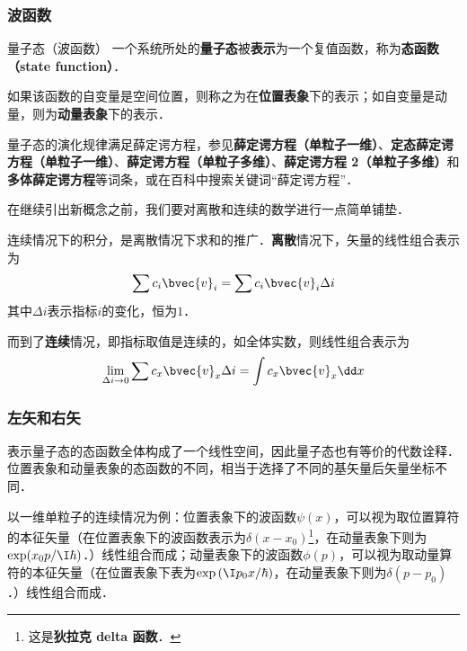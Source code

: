 \subsubsection{波函数}

\begin{definition}{量子态（波函数）}\label{QMPrcp_def6}
一个系统所处的\textbf{量子态}被\textbf{表示}为一个复值函数，称为\textbf{态函数（state function）}．

如果该函数的自变量是空间位置，则称之为在\textbf{位置表象}下的表示；如自变量是动量，则为\textbf{动量表象}下的表示．
\end{definition}

量子态的演化规律满足薛定谔方程，参见\textbf{薛定谔方程（单粒子一维）}、\textbf{定态薛定谔方程（单粒子一维）}、\textbf{薛定谔方程（单粒子多维）}、\textbf{薛定谔方程 2（单粒子多维）}和\textbf{多体薛定谔方程}等词条，或在百科中搜索关键词“薛定谔方程”．


在继续引出新概念之前，我们要对离散和连续的数学进行一点简单铺垫．

连续情况下的积分，是离散情况下求和的推广．\textbf{离散}情况下，矢量的线性组合表示为
\begin{equation}
\sum c_i\bvec{v}_i = \sum c_i\bvec{v}_i \Delta i
\end{equation}
其中$\Delta i$表示指标$i$的变化，恒为$1$．

而到了\textbf{连续}情况，即指标取值是连续的，如全体实数，则线性组合表示为
\begin{equation}
\lim\limits_{\Delta i\to 0}\sum c_x\bvec{v}_x \Delta i=\int c_x\bvec{v}_x \dd x
\end{equation}



\subsubsection{左矢和右矢}

表示量子态的态函数全体构成了一个线性空间，因此量子态也有等价的代数诠释．位置表象和动量表象的态函数的不同，相当于选择了不同的基矢量后矢量坐标不同．

以一维单粒子的连续情况为例：位置表象下的波函数$\psi(x)$，可以视为取位置算符的本征矢量（在位置表象下的波函数表示为$\delta(x-x_0)$\footnote{这是\textbf{狄拉克 delta 函数}．}，在动量表象下则为$\exp(x_0p/\I\hbar)$．）线性组合而成；动量表象下的波函数$\phi(p)$，可以视为取动量算符的本征矢量（在位置表象下表为$\exp{(\I p_0 x/\hbar)}$，在动量表象下则为$\delta(p-p_0)$．）线性组合而成．

